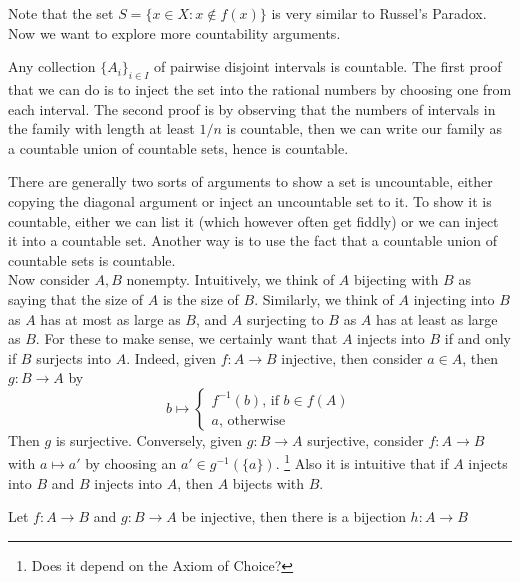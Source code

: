 Note that the set $S=\{x\in X:x\notin f(x)\}$ is very similar to Russel's Paradox.\\
Now we want to explore more countability arguments.
\begin{example}
    Any collection $\{A_i\}_{i\in I}$ of pairwise disjoint intervals is countable.
    The first proof that we can do is to inject the set into the rational numbers by choosing one from each interval.
    The second proof is by observing that the numbers of intervals in the family with length at least $1/n$ is countable, then we can write our family as a countable union of countable sets, hence is countable.
\end{example}
There are generally two sorts of arguments to show a set is uncountable, either copying the diagonal argument or inject an uncountable set to it.
To show it is countable, either we can list it (which however often get fiddly) or we can inject it into a countable set.
Another way is to use the fact that a countable union of countable sets is countable.\\
Now consider $A,B$ nonempty.
Intuitively, we think of $A$ bijecting with $B$ as saying that the size of $A$ is the size of $B$.
Similarly, we think of $A$ injecting into $B$ as $A$ has at most as large as $B$, and $A$ surjecting to $B$ as $A$ has at least as large as $B$.
For these to make sense, we certainly want that $A$ injects into $B$ if and only if $B$ surjects into $A$.
Indeed, given $f:A\to B$ injective, then consider $a\in A$, then $g:B\to A$ by
$$b\mapsto\begin{cases}
    f^{-1}(b)\text{, if $b\in f(A)$}\\
    a\text{, otherwise}
\end{cases}$$
Then $g$ is surjective.
Conversely, given $g:B\to A$ surjective, consider $f:A\to B$ with $a\mapsto a'$ by choosing an $a'\in g^{-1}(\{a\})$.
\footnote{Does it depend on the Axiom of Choice?}
Also it is intuitive that if $A$ injects into $B$ and $B$ injects into $A$, then $A$ bijects with $B$.
\begin{theorem}
    Let $f:A\to B$ and $g:B\to A$ be injective, then there is a bijection $h:A\to B$
\end{theorem}
